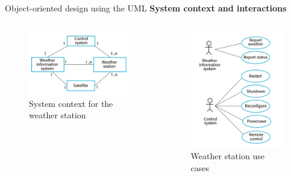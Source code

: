 \documentclass{beamer}
\begin{document}
\begin{frame}{Object-oriented design using the UML}
	\textbf{System context and interactions}
\begin{columns}
	\begin{figure}
		\includegraphics[scale=.5]{img/m3_1}
		\caption{System 
			context for the 
			weather station 
		}
	\end{figure}
		\begin{figure}
		\includegraphics[scale=.5]{img/m3_2}
		\caption{Weather 
			station use cases
		}
	\end{figure}
\end{columns}
\end{frame}
\end{document}
